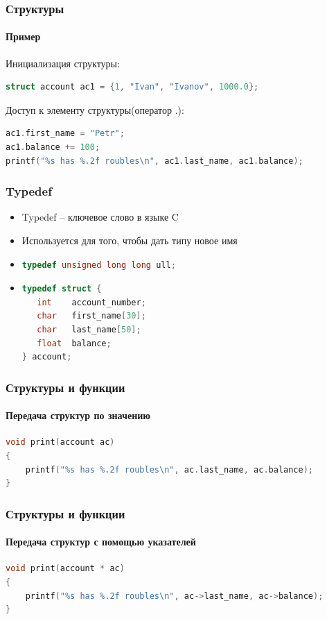 \documentclass[14pt,pdf,hyperref={unicode}]{beamer}
\begin{document}
\begin{frame}[fragile]
\frametitle{Структуры} 
\framesubtitle{Пример} 
Инициализация структуры:
\begin{lstlisting}[language=C++,basicstyle=\ttfamily,keywordstyle=\color{blue}]
struct account ac1 = {1, "Ivan", "Ivanov", 1000.0};
\end{lstlisting}
Доступ к элементу структуры(оператор .):
\begin{lstlisting}[language=C++,basicstyle=\ttfamily,keywordstyle=\color{blue}]
ac1.first_name = "Petr";
ac1.balance += 100;
printf("%s has %.2f roubles\n", ac1.last_name, ac1.balance);
\end{lstlisting}
\end{frame}


\begin{frame}[fragile]
\frametitle{Typedef} 
\begin{itemize}
\item Typedef -- ключевое слово в языке C \\
\item Используется для того, чтобы дать типу новое имя \\
\item 
\begin{lstlisting}[language=C++,basicstyle=\ttfamily,keywordstyle=\color{blue}]
typedef unsigned long long ull;
\end{lstlisting}
\item 
\begin{lstlisting}[language=C++,basicstyle=\ttfamily,keywordstyle=\color{blue}]
typedef struct {
   int    account_number;
   char   first_name[30];
   char   last_name[50];
   float  balance;
} account;
\end{lstlisting}
\end{itemize}
\end{frame}

\begin{frame}[fragile]
\frametitle{Структуры и функции} 
\framesubtitle{Передача структур по значению} 

\begin{lstlisting}[language=C++,basicstyle=\ttfamily,keywordstyle=\color{blue}]
void print(account ac)
{
    printf("%s has %.2f roubles\n", ac.last_name, ac.balance);
}
\end{lstlisting}
\end{frame}



\begin{frame}[fragile]
\frametitle{Структуры и функции} 
\framesubtitle{Передача структур с помощью указателей} 

\begin{lstlisting}[language=C++,basicstyle=\ttfamily,keywordstyle=\color{blue}]
void print(account * ac)
{
    printf("%s has %.2f roubles\n", ac->last_name, ac->balance);
}
\end{lstlisting}
\end{frame}
\end{document}
